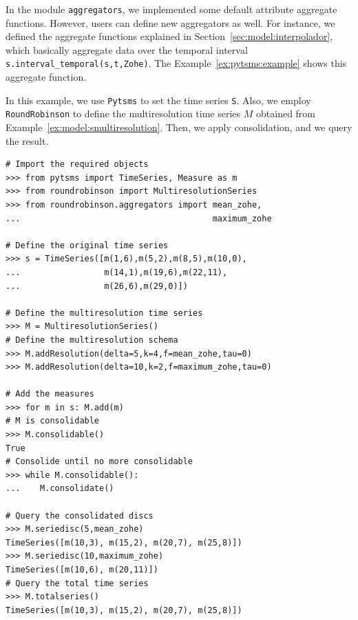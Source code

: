 In the module \texttt{aggregators}, we implemented some default
attribute aggregate functions. However, users can define new
aggregators as well. For instance, we defined the \zohe{} aggregate
functions explained in Section~\ref{sec:model:interpolador}, which
basically aggregate data over the temporal interval
\verb|s.interval_temporal(s,t,Zohe)|.  The
Example~\ref{ex:pytsms:example} shows this aggregate function.

\begin{example}
  In this example, we use \texttt{Pytsms} to set the time series
  \texttt{S}. Also, we employ \texttt{RoundRobinson} to define the
  multiresolution time series $M$ obtained from
  Example~\ref{ex:model:smultiresolution}. Then, we apply
  consolidation, and we query the result.

{\small
\begin{verbatim}
# Import the required objects
>>> from pytsms import TimeSeries, Measure as m
>>> from roundrobinson import MultiresolutionSeries
>>> from roundrobinson.aggregators import mean_zohe,
...                                       maximum_zohe

# Define the original time series
>>> s = TimeSeries([m(1,6),m(5,2),m(8,5),m(10,0),
...                 m(14,1),m(19,6),m(22,11),
...                 m(26,6),m(29,0)])

# Define the multiresolution time series
>>> M = MultiresolutionSeries()
# Define the multiresolution schema
>>> M.addResolution(delta=5,k=4,f=mean_zohe,tau=0)
>>> M.addResolution(delta=10,k=2,f=maximum_zohe,tau=0)

# Add the measures
>>> for m in s: M.add(m)
# M is consolidable
>>> M.consolidable()
True
# Consolide until no more consolidable
>>> while M.consolidable():
...    M.consolidate()

# Query the consolidated discs 
>>> M.seriedisc(5,mean_zohe)
TimeSeries([m(10,3), m(15,2), m(20,7), m(25,8)])
>>> M.seriedisc(10,maximum_zohe)
TimeSeries([m(10,6), m(20,11)])
# Query the total time series
>>> M.totalseries()
TimeSeries([m(10,3), m(15,2), m(20,7), m(25,8)])
\end{verbatim}
}
\end{example}






